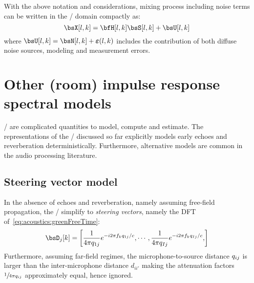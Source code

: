\mynewline
With the above notation and considerations, mixing process including noise terms can be written in the \STFT/ domain compactly as:
\begin{equation}\label{eq:processing:model:stfs}
    \MICS[l,k] = \FLTSS[l,k] \SRCS[l,k] + \bsU[l,k]
\end{equation}
where $\bsU[l,k] = \bsN[l,k] + \boldsymbol{\varepsilon}(l,k)$ includes the contribution of both diffuse noise sources, modeling and measurement errors.



\section{Other (room) impulse response spectral models}\label{sec:processing:rirmodels}
\RIRs/ are complicated quantities to model, compute and estimate.
The representations of the \RIR/ discussed so far explicitly models early echoes and reverberation deterministically.
Furthermore, alternative models are common in the audio processing literature.

\subsection{Steering vector model}\label{subsec:processing:steering}
In the absence of echoes and reverberation, namely assuming free-field propagation,
the \RIRs/ simplify to \textit{steering vectors}, namely the \ac{DFT} of~\cref{eq:acoustics:greenFreeTime}:
\begin{equation}\label{eq:processing:steering}
    \bsD_{j}[k] = \klist{\frac{1}{4 \pi \distMicSrc_{1j}} \cste^{-\csti 2 \pi f_k \distMicSrc_{1j} / c},
                            \cdots,
                            \frac{1}{4 \pi \distMicSrc_{Ij}} \cste^{-\csti 2 \pi f_k \distMicSrc_{Ij} / c},
                    }
\end{equation}
Furthermore, assuming far-field regimes, the microphone-to-source distance $q_{ij}$ is larger than the
inter-microphone distance $d_{ii'}$ making the attenuation factors $\sfrac{1}{4 \pi q_{ij}}$ approximately equal, hence ignored.


